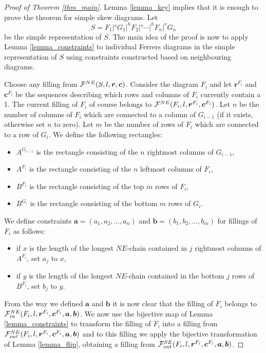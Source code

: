 \begin{proof}[Proof of Theorem \ref{thm_main}]
Lemma \ref{lemma_key} implies that it is enough to prove the theorem for simple skew diagrams. Let
$$S = F_1 |^v G_1 |^h F_2 |^v \cdots |^h F_n |^v G_n$$
be the simple representation of $S$.  The main idea of the proof
is now to apply Lemma \ref{lemma_constraints} to individual Ferrers diagrams in the simple representation of $S$ using constraints
constructed based on neighbouring diagrams.

Choose any filling from $\mathcal{F}^{NE}(S, l, \bm{r}, \bm{c})$.
Consider the diagram $F_i$ and let $\bm{r}^{F_i}$ and $\bm{c}^{F_i}$ be the sequences describing which rows and columns of $F_i$
currently contain a 1. The current filling of $F_i$ of course belongs to $\mathcal{F}^{NE}(F_i, l, \bm{r}^{F_i}, \bm{c}^{F_i})$. Let $n$ be the number
of columns of $F_i$ which are connected to a column of $G_{i-1}$ (if it exists, otherwise set $n$ to zero). Let $m$ be the number
of rows of $F_i$ which are connected to a row of $G_i$. We define the following rectangles:
\begin{itemize}
\item $A^{G_{i-1}}$ is the rectangle consisting of the $n$ rightmost columns of $G_{i-1}$,
\item $A^{F_i}$ is the rectangle consisting of the $n$ leftmost columns of $F_i$,
\item $B^{F_i}$ is the rectangle consisting of the top $m$ rows of $F_i$,
\item $B^{G_i}$ is the rectangle consisting of the bottom $m$ rows of $G_i$.
\end{itemize}
We define constraints $\bm{a} = (a_1, a_2, \ldots, a_n)$
and $\bm{b} = (b_1, b_2, \ldots, b_m)$ for fillings of $F_i$ as follows:
\begin{itemize}
\item if $x$ is the length of the longest $NE$-chain contained in $j$ rightmost columns of $A^{F_i}$, set $a_j$ to $x$,
\item if $y$ is the length of the longest $NE$-chain contained in the bottom $j$ rows of $B^{F_i}$, set $b_j$ to $y$.
\end{itemize}

From the way we defined $\bm{a}$ and $\bm{b}$ it is now clear that the filling of $F_i$
belongs to $\mathcal{F}^{NE}_{in}(F_i, l, \bm{r}^{F_i}, \bm{c}^{F_i}, \bm{a}, \bm{b})$. We now use the bijective map
of Lemma \ref{lemma_constraints} to transform the filling of $F_i$ into a filling
from $\mathcal{F}^{NE}_{out}(F_i, l, \bm{r}^{F_i}, \bm{c}^{F_i}, \bm{a}, \bm{b})$ and to this filling
we apply the bijective transformation of Lemma \ref{lemma_flip}, obtaining
a filling from $\mathcal{F}^{SE}_{out}(F_i, l, \bm{r}^{F_i}, \bm{c}^{F_i}, \bm{a}, \bm{b})$.


\end{proof}
